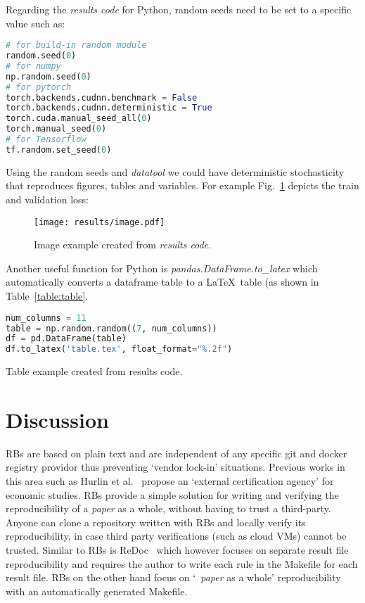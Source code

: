 \documentclass[journal]{IEEEtran}
\begin{document}
Regarding the \textit{results code} for Python, random seeds need to be set to a specific value such as:
\begin{lstlisting}[language=python, style=lststyle, caption={Python reproducibility commands for some popular libraries.}, captionpos=b]
# for build-in random module
random.seed(0)
# for numpy
np.random.seed(0)
# for pytorch
torch.backends.cudnn.benchmark = False
torch.backends.cudnn.deterministic = True
torch.cuda.manual_seed_all(0)
torch.manual_seed(0)
# for Tensorflow
tf.random.set_seed(0)
\end{lstlisting}

Using the random seeds and \textit{datatool} we could have deterministic stochasticity that reproduces figures, tables and variables.
For example Fig.~\ref{fig:image} depicts the train and validation loss:
\begin{figure}[h]
	\texttt{[image: results/image.pdf]}
	\caption{Image example created from \textit{results code}.}
	\label{fig:image}
\end{figure}

Another useful function for Python is \textit{pandas.DataFrame.to\_latex} which automatically converts a dataframe table to a \LaTeX\ table (as shown in Table~\ref{table:table}.

\begin{lstlisting}[language=python, style=lststyle, caption={Convert Pandas DataFrame to \LaTeX\ table.}, captionpos=b]
num_columns = 11
table = np.random.random((7, num_columns))
df = pd.DataFrame(table)
df.to_latex('table.tex', float_format="%.2f")
\end{lstlisting}

\begin{table}[h]
	\centering
	\caption{Table example created from results code.}
	\label{table:table}
	\setlength\tabcolsep{4.2pt}
	
\end{table}

\section{Discussion}
RBs are based on plain text and are independent of any specific git and docker registry providor thus preventing `vendor lock-in' situations.
Previous works in this area such as Hurlin et al.~\cite{hurlin2019reproducibility} propose an `external certification agency' for economic studies.
RBs provide a simple solution for writing and verifying the reproducibility of a \textit{paper} as a whole, without having to trust a third-party.
Anyone can clone a repository written with RBs and locally verify its reproducibility, in case third party verifications (such as cloud VMs) cannot be trusted.
Similar to RBs is ReDoc~\cite{schwab2000making} which however focuses on separate result file reproducibility and requires the author to write each rule in the Makefile for each result file.
RBs on the other hand focus on `~\textit{paper} as a whole' reproducibility with an automatically generated Makefile.
\end{document}

